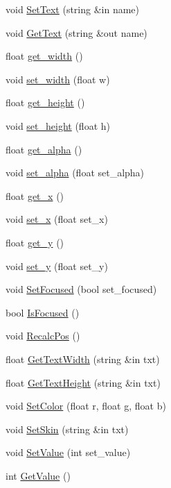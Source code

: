 \begin{DoxyCompactItemize}
\item 
void \hyperlink{class_g_u_i_track_bar_adf110174e2e2d22be42b5cff2f3c4045}{Set\+Text} (string \&in name)
\item 
void \hyperlink{class_g_u_i_track_bar_a6f4a2a4ccc83da8da713c8ec9cc4ddf9}{Get\+Text} (string \&out name)
\item 
float \hyperlink{class_g_u_i_track_bar_a9dfaa0ee6a6bd5b504f2da2d96acf191}{get\+\_\+width} ()
\item 
void \hyperlink{class_g_u_i_track_bar_ab5cedd6c9d836a56af4cbc4c19200e1d}{set\+\_\+width} (float w)
\item 
float \hyperlink{class_g_u_i_track_bar_a26de8c2b9fcf49e595080c89df9d3591}{get\+\_\+height} ()
\item 
void \hyperlink{class_g_u_i_track_bar_a39e700662d8147185fb22f35970cea25}{set\+\_\+height} (float h)
\item 
float \hyperlink{class_g_u_i_track_bar_aec43dc778aac26a143c8be8cee021420}{get\+\_\+alpha} ()
\item 
void \hyperlink{class_g_u_i_track_bar_a16bdadbc85dc5710fc79ae2500211ef7}{set\+\_\+alpha} (float set\+\_\+alpha)
\item 
float \hyperlink{class_g_u_i_track_bar_ad2d9c2cdc5ace20b8f5dee0663d270e4}{get\+\_\+x} ()
\item 
void \hyperlink{class_g_u_i_track_bar_ae40cba720f026868c654ebbd62fde8a0}{set\+\_\+x} (float set\+\_\+x)
\item 
float \hyperlink{class_g_u_i_track_bar_afa2f929dc0b5a4a29703f722b5d43f23}{get\+\_\+y} ()
\item 
void \hyperlink{class_g_u_i_track_bar_a0bfc78a20b823b228fd6a13215acfe22}{set\+\_\+y} (float set\+\_\+y)
\item 
void \hyperlink{class_g_u_i_track_bar_afd7e32106ac53e1f56fb140a5dbfb65a}{Set\+Focused} (bool set\+\_\+focused)
\item 
bool \hyperlink{class_g_u_i_track_bar_a8a67b58ba7308d3bd6a78eeb34e032fd}{Is\+Focused} ()
\item 
void \hyperlink{class_g_u_i_track_bar_ad79c4a8fc84761125579b062d5bc562d}{Recalc\+Pos} ()
\item 
float \hyperlink{class_g_u_i_track_bar_ac0ed210a9e6402e04bd7b02ec9d8cd56}{Get\+Text\+Width} (string \&in txt)
\item 
float \hyperlink{class_g_u_i_track_bar_a744300481a26f0bb1fb9874ae6ede72a}{Get\+Text\+Height} (string \&in txt)
\item 
void \hyperlink{class_g_u_i_track_bar_a7aa7a25811612e13356d9c5a3951e4df}{Set\+Color} (float r, float g, float b)
\item 
void \hyperlink{class_g_u_i_track_bar_a3d444544651c46a869d527f2474dd721}{Set\+Skin} (string \&in txt)
\item 
void \hyperlink{class_g_u_i_track_bar_a85603f16317c4b7ba6c37e4bdbf3bc38}{Set\+Value} (int set\+\_\+value)
\item 
int \hyperlink{class_g_u_i_track_bar_aa832e8d88c6b29ed1b8f4b23fa196c3a}{Get\+Value} ()
\end{DoxyCompactItemize}

